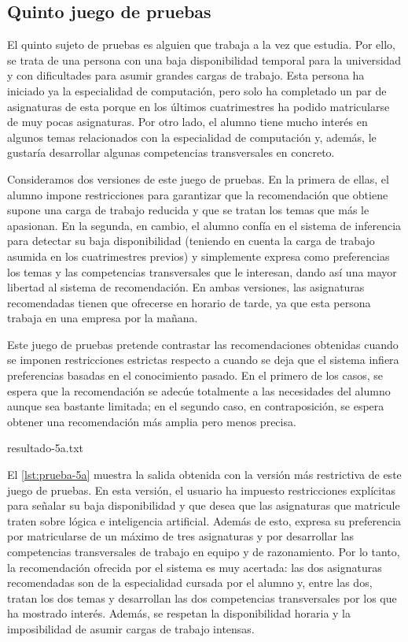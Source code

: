 
\subsection{Quinto juego de pruebas} \label{sec:prueba-5}

El quinto sujeto de pruebas es alguien que trabaja a la vez que estudia. Por 
ello, se trata de una persona con una baja disponibilidad temporal para la 
universidad y con dificultades para asumir grandes cargas de trabajo. Esta 
persona ha iniciado ya la especialidad de computación, pero solo ha 
completado un par de asignaturas de esta porque en los últimos cuatrimestres 
ha podido matricularse de muy pocas asignaturas. Por otro lado, el alumno 
tiene mucho interés en algunos temas relacionados con la especialidad de 
computación y, además, le gustaría desarrollar algunas competencias 
transversales en concreto.

Consideramos dos versiones de este juego de pruebas. En la primera de ellas, 
el alumno impone restricciones para garantizar que la recomendación que 
obtiene supone una carga de trabajo reducida y que se tratan los temas que 
más le apasionan. En la segunda, en cambio, el alumno confía en el sistema de 
inferencia para detectar su baja disponibilidad (teniendo en cuenta la carga 
de trabajo asumida en los cuatrimestres previos) y simplemente expresa como 
preferencias los temas y las competencias transversales que le interesan, 
dando así una mayor libertad al sistema de recomendación. En ambas versiones,
las asignaturas recomendadas tienen que ofrecerse en horario de tarde, ya que 
esta persona trabaja en una empresa por la mañana.

Este juego de pruebas pretende contrastar las recomendaciones obtenidas cuando 
se imponen restricciones estrictas respecto a cuando se deja que el sistema 
infiera preferencias basadas en el conocimiento pasado. En el primero de los 
casos, se espera que la recomendación se adecúe totalmente a las 
necesidades del alumno aunque sea bastante limitada; en el segundo caso, en 
contraposición, se espera obtener una recomendación más amplia pero menos 
precisa.

%
    {resultado-5a.txt}

El \autoref{lst:prueba-5a} muestra la salida obtenida con la versión más 
restrictiva de este juego de pruebas. En esta versión, el usuario ha impuesto 
restricciones explícitas para señalar su baja disponibilidad y que desea que 
las asignaturas que matricule traten sobre lógica e inteligencia artificial. 
Además de esto, expresa su preferencia por matricularse de un máximo de tres 
asignaturas y por desarrollar las competencias transversales de trabajo en 
equipo y de razonamiento. Por lo tanto, la recomendación ofrecida por el 
sistema es muy acertada: las dos asignaturas recomendadas son de la 
especialidad cursada por el alumno y, entre las dos, tratan los dos temas y 
desarrollan las dos competencias transversales por los que ha mostrado 
interés. Además, se respetan la disponibilidad horaria y la imposibilidad de 
asumir cargas de trabajo intensas. 

